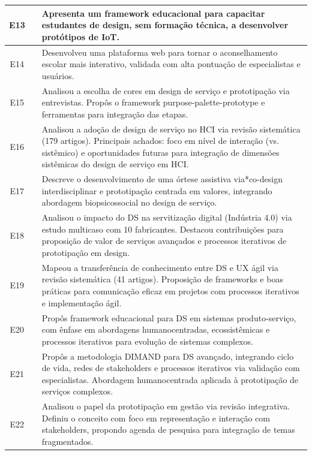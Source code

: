 \begin{longtable}{|c|m{4cm}|m{10cm}|}
	E13 & \cite{Kim2024} & Apresenta um framework educacional para capacitar estudantes de design, sem formação técnica, a desenvolver protótipos de IoT. \\ \hline
	E14 & \cite{Suryawati2024} & Desenvolveu uma plataforma web para tornar o aconselhamento escolar mais interativo, validada com alta pontuação de especialistas e usuários. \\ \hline
	E15 & \cite{hegemann2024palette} & Analisou a escolha de cores em design de serviço e prototipação via entrevistas. Propôs o framework purpose-palette-prototype e ferramentas para integração das etapas. \\ \hline
	E16 & \cite{lee2022how} & Analisou a adoção de design de serviço no HCI via revisão sistemática (179 artigos). Principais achados: foco em nível de interação (vs. sistêmico) e oportunidades futuras para integração de dimensões sistêmicas do design de serviço em HCI. \\ \hline
	E17 & \cite{quintero2021interdisciplinary} & Descreve o desenvolvimento de uma órtese assistiva via*co-design interdisciplinar e prototipação centrada em valores, integrando abordagem biopsicossocial no design de serviço. \\ \hline
	E18 & \cite{iriarte2023service} &Analisou o impacto do DS na servitização digital (Indústria 4.0) via estudo multicaso com 10 fabricantes. Destacou contribuições para proposição de valor de serviços avançados e processos iterativos de prototipação em design. \\ \hline
	E19 & \cite{leinonen2023service} & Mapeou a transferência de conhecimento entre DS e UX ágil via revisão sistemática (41 artigos). Proposição de frameworks e boas práticas para comunicação eficaz em projetos com processos iterativos e implementação ágil. \\ \hline
	E20 & \cite{mager2023product} & Propôs framework educacional para DS em sistemas produto-serviço, com ênfase em abordagens humanocentradas, ecossistêmicas e processos iterativos para evolução de sistemas complexos. \\ \hline
	E21 & \cite{nguyen2022human} & Propôs a metodologia DIMAND para DS avançado, integrando ciclo de vida, redes de stakeholders e processos iterativos via validação com especialistas. Abordagem humanocentrada aplicada à prototipação de serviços complexos. \\ \hline
	E22 & \cite{paust2025integrative} & Analisou o papel da prototipação em gestão via revisão integrativa. Definiu o conceito com foco em representação e interação com stakeholders, propondo agenda de pesquisa para integração de temas fragmentados. \\ \hline

\end{longtable}
